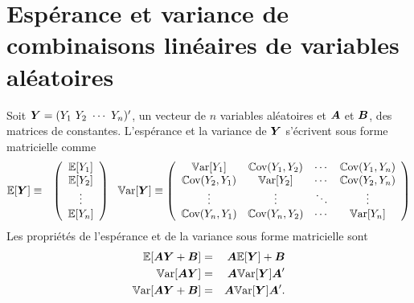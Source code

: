 \section{Espérance et variance de combinaisons linéaires de variables aléatoires}

 Soit $\boY=(Y_1\ Y_2\ \cdots\ Y_n)'$, un vecteur de
$n$ variables al\'eatoires et $\bo{A}$ et $\bo{B}$, des matrices de constantes. L'espérance et la variance de $\boY$ s'écrivent sous forme matricielle comme
\begin{eqnarray*}
\esp[\boY]&\equiv&\left(\begin{array}{c} \esp[Y_1]\\ \esp[Y_2]\\ \vdots \\ \esp[Y_n]\end{array}\right)\
\ \var[\boY]\equiv\left(\begin{array}{cccc}
\var[Y_1] & \cov(Y_1,Y_2) & \cdots & \cov(Y_1,Y_n) \\
\cov(Y_2,Y_1) & \var[Y_2] & \cdots & \cov(Y_2,Y_n) \\
\vdots & \vdots & \ddots & \vdots \\
\cov(Y_n,Y_1) & \cov(Y_n,Y_2) & \cdots & \var[Y_n]\end{array}\right)\\
\end{eqnarray*}
Les propriétés de l'espérance et de la variance sous forme matricielle sont
\begin{eqnarray*}
\esp[\bo{A}\boY+\bo{B}]&=&\bo{A}\esp[\boY]+\bo{B} \\
\var[\bo{A}\boY] &= & \bo{A}\var[\boY]\bo{A}' \\
\var[\bo{A}\boY+\bo{B}] & = & \bo{A}\var[\boY]\bo{A}'.
\end{eqnarray*} 